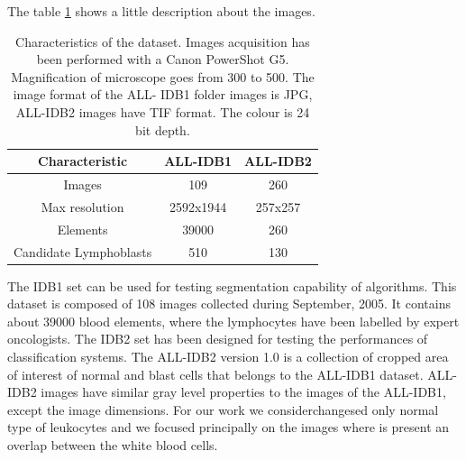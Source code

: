 \bigskip

The table \ref{tableidb} shows a little description about the images.
\begin{table}
\centering
\begin{tabular}{|c|c|c|}
\hline 
Characteristic & ALL-IDB1 & ALL-IDB2 \\ 
\hline 
Images & 109 & 260 \\ 
\hline 
Max resolution & 2592x1944 & 257x257 \\ 
\hline 
Elements & 39000 & 260 \\ 
\hline 
Candidate Lymphoblasts & 510 & 130 \\ 
\hline 
\end{tabular} 
\caption{Characteristics of the dataset. Images acquisition has been performed with a Canon PowerShot G5. Magnification of microscope goes from 300 to 500. The image format of the ALL- IDB1 folder images is JPG, ALL-IDB2 images have TIF format. The colour is 24 bit depth.}
\label{tableidb}
\end{table}
The IDB1 set can be used for testing segmentation capability of algorithms. This dataset is composed of 108 images collected during September, 2005. It contains about 39000 blood elements, where the lymphocytes have been labelled by expert oncologists.\cite{website:IDB}
The IDB2 set has been designed for testing the performances of classification systems. The ALL-IDB2 version 1.0 is a collection of cropped area of interest of normal and blast cells that belongs to the ALL-IDB1 dataset. ALL-IDB2 images have similar gray level properties to the images of the ALL-IDB1, except the image dimensions.\cite{website:IDB}
For our work we considerchangesed only normal type of leukocytes and we focused principally on the images where is present an overlap between the white blood cells.

